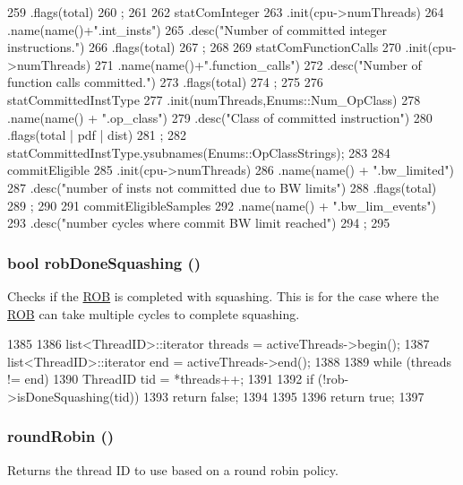 \begin{DoxyCode}
{259         .flags(total)
260         ;
261 
262     statComInteger
263         .init(cpu->numThreads)
264         .name(name()+".int_insts")
265         .desc("Number of committed integer instructions.")
266         .flags(total)
267         ;
268 
269     statComFunctionCalls
270         .init(cpu->numThreads)
271         .name(name()+".function_calls")
272         .desc("Number of function calls committed.")
273         .flags(total)
274         ;
275 
276     statCommittedInstType
277         .init(numThreads,Enums::Num_OpClass)
278         .name(name() + ".op_class")
279         .desc("Class of committed instruction")
280         .flags(total | pdf | dist)
281         ;
282     statCommittedInstType.ysubnames(Enums::OpClassStrings);
283 
284     commitEligible
285         .init(cpu->numThreads)
286         .name(name() + ".bw_limited")
287         .desc("number of insts not committed due to BW limits")
288         .flags(total)
289         ;
290 
291     commitEligibleSamples
292         .name(name() + ".bw_lim_events")
293         .desc("number cycles where commit BW limit reached")
294         ;
295 }
\end{DoxyCode}
\hypertarget{classDefaultCommit_a6949aa47bdaf57471e048da5c5b7c14c}{
\subsubsection[{robDoneSquashing}]{\setlength{\rightskip}{0pt plus 5cm}bool robDoneSquashing ()}}
\label{classDefaultCommit_a6949aa47bdaf57471e048da5c5b7c14c}
Checks if the \hyperlink{classROB}{ROB} is completed with squashing. This is for the case where the \hyperlink{classROB}{ROB} can take multiple cycles to complete squashing. 


\begin{DoxyCode}
1385 {
1386     list<ThreadID>::iterator threads = activeThreads->begin();
1387     list<ThreadID>::iterator end = activeThreads->end();
1388 
1389     while (threads != end) {
1390         ThreadID tid = *threads++;
1391 
1392         if (!rob->isDoneSquashing(tid))
1393             return false;
1394     }
1395 
1396     return true;
1397 }
\end{DoxyCode}
\hypertarget{classDefaultCommit_a8aab9cacbc483081596b13ecd5192eb5}{
\subsubsection[{roundRobin}]{ roundRobin ()}}
\label{classDefaultCommit_a8aab9cacbc483081596b13ecd5192eb5}
Returns the thread ID to use based on a round robin policy. 


